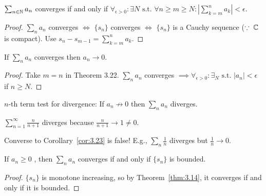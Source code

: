 \begin{thm}
	$\sum_{n \in \mathbb{N}}{a_{n}}$ converges if and only if $\forall_{\epsilon >0}: \exists N \text{ s.t. }\forall{n\ge m\ge  N}: |\sum_{k=m}^{n}{a_{k}}| <\epsilon $.
	\begin{proof}
		$\sum_{n}{a_{n}}$ converges $\Leftrightarrow $ $\{ {s}_{n}\}$ converges $\Leftrightarrow$ $\{ {s}_{n}\}$ is a Cauchy sequence ($\because\; \mathbb{C}$ is compact). Use $s_{n}-s_{m-1}=\sum_{k=m}^{n}{a_k}$.
	\end{proof}
\end{thm}
\begin{corollary}
	\label{cor:3.23}
	If $\sum_{n}{a_{n}}$ converges then $a_{n}\to 0$.
	\begin{proof}
		Take $m=n$ in Theorem 3.22. $\sum_{n}{a_{n}}$ converges $\implies \forall_{\epsilon > 0}: \exists_{N} \text{ s.t. } |a_{n}| <\epsilon $ if $n\ge N$.
	\end{proof}
	\begin{remark}
		$n$-th term test for divergence: If $a_{n}\not\to 0$ then $\sum_n{a_{n}}$ diverges.
		\begin{example}
			$\sum_{n=1}^{\infty }{\frac{n}{n+1}}$ diverges because $\frac{n}{n+1}\to 1\neq 0$.
		\end{example}
		Converse to Corollary~\ref{cor:3.23} is false! E.g., $\sum_{n}{\frac{1}{n}}$ diverges but $\frac{1}{n}\to 0$.
	\end{remark}
\end{corollary}

\begin{thm}[24]
	If $a_{n}\ge 0$ , then $\sum_{n}{a_{n}}$ converges if and only if $\{ {s}_{n}\}$ is bounded.
	\begin{proof}
		$\{ {s}_{n}\}$ is monotone increasing, so by Theorem~\ref{thm:3.14}, it converges if and only if it is bounded.
	\end{proof}
\end{thm}


